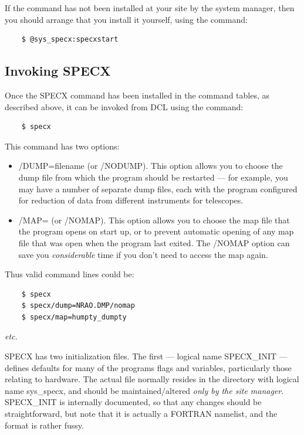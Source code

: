 \documentclass[11pt,twoside]{report}
\newcommand{\etc}{{\it etc.\,}}
\begin{document}
If the command has not been installed at your site by the system manager,
then you should arrange that you install it yourself, using the command:
\begin{verbatim}
    $ @sys_specx:specxstart
\end{verbatim}

\subsection{Invoking SPECX}

Once the SPECX command has been installed in the command tables, as described
above, it can be invoked from DCL using the command:
\begin{verbatim}
    $ specx
\end{verbatim}
This command has two options:
\begin{itemize}
\item /DUMP=filename (or /NODUMP). This option
  allows you to choose the dump file from which the program should be restarted
  --- for example, you may have a number of separate dump files, each with the
  program configured for reduction of data from different instruments for
  telescopes. \item /MAP= (or /NOMAP). This option
  allows you to choose the map file that the program opens on start up, or to
  prevent automatic opening of any map file that was open when the program last
  exited. The /NOMAP option can save you {\em considerable} time if you don't
  need to access the map again.
\end{itemize}

Thus valid command lines could be:
\begin{verbatim}
    $ specx
    $ specx/dump=NRAO.DMP/nomap
    $ specx/map=humpty_dumpty
\end{verbatim}
\etc

SPECX has two initialization files. The first ---
logical name SPECX\_INIT 
--- defines defaults for many of the
programs flags and variables, particularly those relating to hardware. The
actual file normally resides in the directory with logical name sys\_specx, and
should be maintained/altered {\em only by the site manager}. SPECX\_INIT is
internally documented, so that any changes should be straightforward, but note
that it is actually a FORTRAN namelist, and the format is rather fussy.
\end{document}
